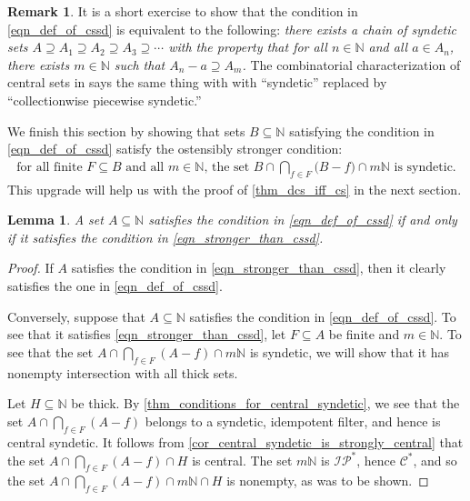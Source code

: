 \documentclass[letter,11pt]{article}
\theoremstyle{plain}
\newtheorem{lemma}[theorem]{Lemma}
\theoremstyle{definition}
\newtheorem{remark}[theorem]{Remark}
\theoremstyle{plain}
\theoremstyle{plain}
\numberwithin{equation}{section}
\newcommand{\N}{\mathbb{N}}
\newcommand{\central}{\mathcal{C}}
\newcommand{\IP}{\mathcal{IP}}
\begin{document}
\begin{remark}
    It is a short exercise to show that the condition in \eqref{eqn_def_of_cssd} is equivalent to the following: \emph{there exists a chain of syndetic sets $A \supseteq A_1 \supseteq A_2 \supseteq A_3 \supseteq \cdots $ with the property that for all $n \in \N$ and all $a \in A_n$, there exists $m \in \N$ such that $A_n - a \supseteq A_m$.}  The combinatorial characterization of central sets in \cite[Thm. 14.25]{hindman_strauss_book_2012} says the same thing with with ``syndetic'' replaced by ``collectionwise piecewise syndetic.''
\end{remark}

We finish this section by showing that sets $B \subseteq \N$ satisfying the condition in \eqref{eqn_def_of_cssd} satisfy the ostensibly stronger condition:
\begin{align}
    \label{eqn_stronger_than_cssd}
    \text{for all finite $F \subseteq B$ and all $m \in \N$, the set } B \cap \bigcap_{f \in F} \big( B - f \big) \cap m \N \text{ is syndetic}.
\end{align}
This upgrade will help us with the proof of \cref{thm_dcs_iff_cs} in the next section.



\begin{lemma}
\label{lemma_upgraded_cssd_property}
    A set $A \subseteq \N$ satisfies the condition in \eqref{eqn_def_of_cssd} if and only if it satisfies the condition in \eqref{eqn_stronger_than_cssd}.
\end{lemma}

\begin{proof}
    If $A$ satisfies the condition in \eqref{eqn_stronger_than_cssd}, then it clearly satisfies the one in \eqref{eqn_def_of_cssd}.

    Conversely, suppose that $A \subseteq \N$ satisfies the condition in \eqref{eqn_def_of_cssd}. To see that it satisfies \eqref{eqn_stronger_than_cssd}, let $F \subseteq A$ be finite and $m \in \N$. To see that the set $A \cap \bigcap_{f \in F} (A-f) \cap m\N$ is syndetic, we will show that it has nonempty intersection with all thick sets.
    
    Let $H \subseteq \N$ be thick. By \cref{thm_conditions_for_central_syndetic}, we see that the set $A \cap \bigcap_{f \in F} (A-f)$ belongs to a syndetic, idempotent filter, and hence is central syndetic.  It follows from \cref{cor_central_syndetic_is_strongly_central} that the set $A \cap \bigcap_{f \in F} (A-f) \cap H$ is central.  The set $m \N$ is $\IP^*$, hence $\central^*$, and so the set $A \cap \bigcap_{f \in F} (A-f) \cap m \N \cap H$ is nonempty, as was to be shown.
\end{proof}
\end{document}
